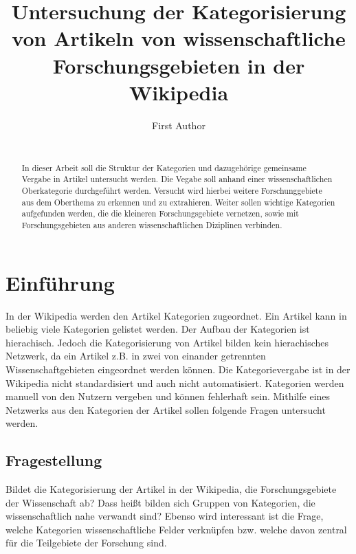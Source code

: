 \documentclass{acm_proc_article-sp}
\begin{document}
\title{Untersuchung der Kategorisierung von Artikeln von wissenschaftliche Forschungsgebieten in der Wikipedia}

\author{
\alignauthor
	First Author\\
	\\
}

\maketitle
\begin{abstract}
In dieser Arbeit soll die Struktur der Kategorien und dazugehörige gemeinsame Vergabe in Artikel untersucht werden. Die Vegabe soll anhand einer wissenschaftlichen Oberkategorie durchgeführt werden. Versucht wird hierbei weitere Forschunggebiete aus dem Oberthema zu erkennen und zu extrahieren. Weiter sollen wichtige Kategorien aufgefunden werden, die die kleineren Forschungsgebiete vernetzen, sowie mit Forschungsgebieten aus anderen wissenschaftlichen Diziplinen verbinden.
\end{abstract}

\section{Einführung}
In der Wikipedia werden den Artikel Kategorien zugeordnet. Ein Artikel kann in beliebig viele Kategorien gelistet werden. Der Aufbau der Kategorien ist hierachisch. Jedoch die Kategorisierung von Artikel bilden kein hierachisches Netzwerk, da ein Artikel z.B. in zwei von einander getrennten Wissenschaftgebieten eingeordnet werden können. Die Kategorievergabe ist in der Wikipedia nicht standardisiert und auch nicht automatisiert. Kategorien werden manuell von den Nutzern vergeben und können fehlerhaft sein. Mithilfe eines Netzwerks aus den Kategorien der Artikel sollen folgende Fragen untersucht werden. 

\subsection{Fragestellung}
Bildet die Kategorisierung der Artikel in der Wikipedia, die Forschungsgebiete der Wissenschaft ab? Dass heißt bilden sich Gruppen von Kategorien, die wissenschaftlich nahe verwandt sind? Ebenso wird interessant ist die Frage, welche Kategorien wissenschaftliche Felder verknüpfen bzw. welche davon zentral für die Teilgebiete der Forschung sind.
\end{document}
